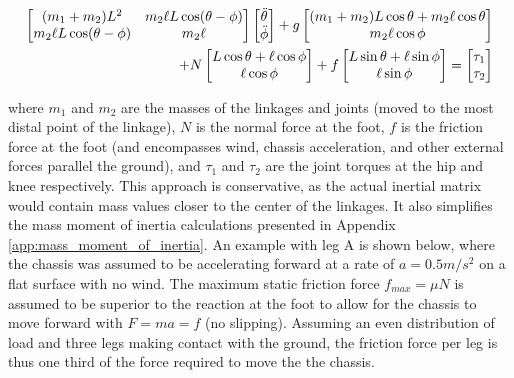 \begin{equation} \label{eq:dynamic_equation}
    \begin{split}
        \begin{bmatrix} 
            (m_1 + m_2) L^2 & m_2 \ell L \cos(\theta-\phi) \\
            m_2 \ell L \cos(\theta-\phi) & m_2 \ell
        \end{bmatrix}
        \begin{bmatrix} \Ddot{\theta} \\ \Ddot{\phi} \end{bmatrix}
        +
        g \begin{bmatrix}
            (m_1 + m_2) L \cos\theta + m_2 \ell \cos\theta \\
            m_2 \ell \cos\phi
        \end{bmatrix} \\
        +
        N \begin{bmatrix}
            L\cos\theta + \ell\cos\phi \\
            \ell\cos\phi
            \end{bmatrix} + f \begin{bmatrix}
            L\sin\theta + \ell\sin\phi \\
            \ell\sin\phi
        \end{bmatrix}
        =
        \begin{bmatrix}
        \tau_1 \\ \tau_2
        \end{bmatrix}
    \end{split}
\end{equation}

where $m_1$ and $m_2$ are the masses of the linkages and joints (moved to the most distal point of the linkage), $N$ is the normal force at the foot, $f$ is the friction force at the foot (and encompasses wind, chassis acceleration, and other external forces parallel the ground), and $\tau_1$ and $\tau_2$ are the joint torques at the hip and knee respectively.
This approach is conservative, as the actual inertial matrix would contain mass values closer to the center of the linkages.
It also simplifies the mass moment of inertia calculations presented in Appendix \ref{app:mass_moment_of_inertia}.
An example with leg A is shown below, where the chassis was assumed to be accelerating forward at a rate of $a = 0.5m/s^2$ on a flat surface with no wind.
The maximum static friction force $f_{max} = \mu N$ is assumed to be superior to the reaction at the foot to allow for the chassis to move forward with $F = ma = f$ (no slipping).
Assuming an even distribution of load and three legs making contact with the ground, the friction force per leg is thus one third of the force required to move the the chassis.

